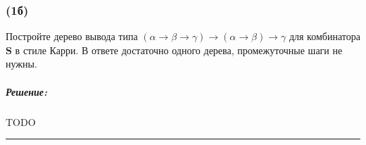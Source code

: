 \documentclass{article}
\newenvironment{proof}{\subparagraph{\hspace{-1em}Решение:\newline}}{\par\noindent\rule{\textwidth}{0.4pt}}
\newcommand{\term}[1]{\mathbf{#1}}
\begin{document}
    \subsubsection{(1б)}

    Постройте дерево вывода типа $(\alpha \to \beta \to \gamma) \to (\alpha \to \beta) \to \gamma$ для комбинатора $\term{S}$ в стиле Карри.
    В ответе достаточно одного дерева, промежуточные шаги не нужны.

    \begin{proof}
        TODO %
    \end{proof}
\end{document}
